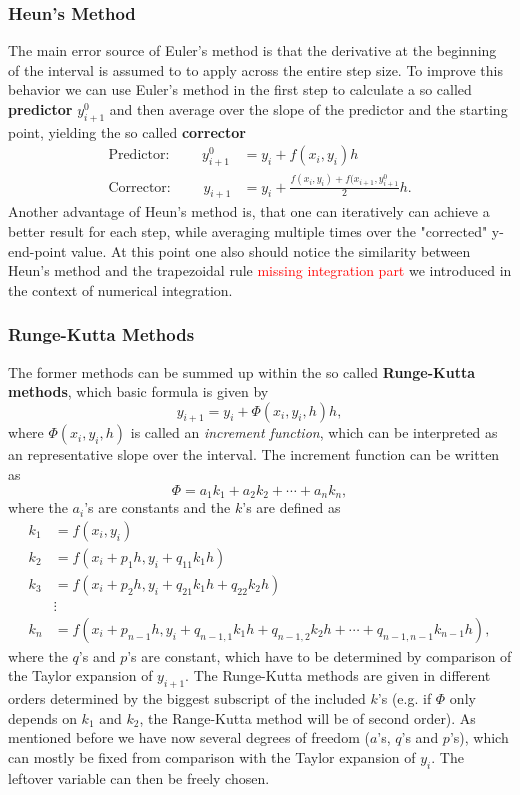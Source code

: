 \subsubsection{Heun's Method}
The main error source of Euler's method is that the derivative at the beginning of the interval is assumed to to apply across the entire step size. To improve this behavior we can use Euler's method in the first step to calculate a so called \textbf{predictor} $y^0_{i+1}$ and then average over the slope of the predictor and the starting point, yielding the so called \textbf{corrector}
\begin{align}
	\text{Predictor: } \qquad y_{i+1}^0 &= y_i + f(x_i,y_i) h \\
	\text{Corrector: } \qquad y_{i+1} &= y_i + \frac{f(x_i, y_i) + f(x_{i+1}, y_{i+1}^0}{2} h.
\end{align}
Another advantage of Heun's method is, that one can iteratively can achieve a better result for each step, while averaging multiple times over the "corrected" y-end-point value. At this point one also should notice the similarity between Heun's method and the trapezoidal rule \textcolor{red}{missing integration part} we introduced in the context of numerical integration.

\subsubsection{Runge-Kutta Methods}
The former methods can be summed up within the so called \textbf{Runge-Kutta methods}, which basic formula is given by
\begin{equation}
	y_{i+1} = y_i + \Phi(x_i, y_i, h) h,
\end{equation}
where $\Phi(x_i, y_i, h)$ is called an \textit{increment function}, which can be interpreted as an representative slope over the interval. The increment function can be written as
\begin{equation}
	\Phi = a_1 k_1 + a_2 k_2 + \cdots + a_n k_n,
\end{equation}
where the $a_i$'s are constants and the $k$'s are defined as
\begin{align}
	k_1 &= f(x_i, y_i) \\
	k_2 &= f(x_i + p_1 h, y_i + q_{11} k_1 h) \\
	k_3 &= f(x_i + p_2 h, y_i + q_{21} k_1 h + q_{22} k_2 h) \\
	&\vdots  \\
	k_n &= f(x_i + p_{n-1} h, y_i + q_{n-1,1} k_1 h + q_{n-1,2} k_2 h+ \cdots + q_{n-1,n-1} k_{n-1} h),
\end{align}
where the $q$'s and $p$'s are constant, which have to be determined by comparison of the Taylor expansion of $y_{i+1}$. The Runge-Kutta methods are given in different orders determined by the biggest subscript of the included $k$'s (e.g. if $\Phi$ only depends on $k_1$ and $k_2$, the Range-Kutta method will be of second order). As mentioned before we have now several degrees of freedom ($a$'s, $q$'s and $p$'s), which can mostly be fixed from comparison with the Taylor expansion of $y_i$. The leftover variable can then be freely chosen. 

